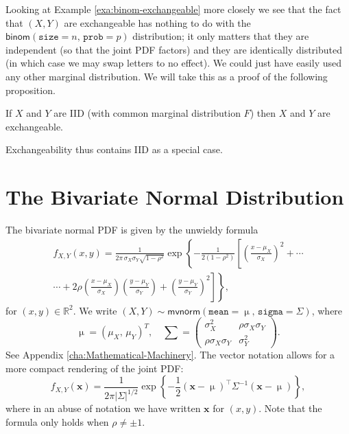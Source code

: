 \documentclass[captions=tableheading]{scrbook}
\begin{document}
Looking at Example \ref{exa:binom-exchangeable} more closely we see that the fact that \((X,Y)\) are exchangeable has nothing to do with the \(\mathsf{binom}(\mathtt{size}=n,\,\mathtt{prob}=p)\) distribution; it only matters that they are independent (so that the joint PDF factors) and they are identically distributed (in which case we may swap letters to no effect). We could just have easily used any other marginal distribution. We will take this as a proof of the following proposition.

\begin{prop}
If \(X\) and \(Y\) are IID (with common marginal distribution \(F\)) then \(X\) and \(Y\) are exchangeable. 
\end{prop}

Exchangeability thus contains IID as a special case. 
\section{The Bivariate Normal Distribution}
\label{sec-7-6}

\label{sec:The-Bivariate-Normal}

The bivariate normal PDF is given by the unwieldy formula
\begin{multline}
f_{X,Y}(x,y)=\frac{1}{2\pi\,\sigma_{X}\sigma_{Y}\sqrt{1-\rho^{2}}}\exp\left\{ -\frac{1}{2(1-\rho^{2})}\left[\left(\frac{x-\mu_{X}}{\sigma_{X}}\right)^{2}+\cdots\right.\right.\\
\left.\left.\cdots+2\rho\left(\frac{x-\mu_{X}}{\sigma_{X}}\right)\left(\frac{y-\mu_{Y}}{\sigma_{Y}}\right)+\left(\frac{y-\mu_{Y}}{\sigma_{Y}}\right)^{2}\right]\right\} ,
\end{multline}
for \((x,y)\in\mathbb{R}^{2}\). We write \((X,Y)\sim\mathsf{mvnorm}(\mathtt{mean}=\upmu,\,\mathtt{sigma}=\Sigma)\), where
\begin{equation}
\upmu=(\mu_{X},\,\mu_{Y})^{T},\quad\sum=\left(
\begin{array}{cc}
\sigma_{X}^{2} & \rho\sigma_{X}\sigma_{Y}\\
\rho\sigma_{X}\sigma_{Y} & \sigma_{Y}^{2}
\end{array}
\right).
\end{equation}
See Appendix \ref{cha:Mathematical-Machinery}. The vector notation allows for a more compact rendering of the joint PDF:
\begin{equation}
f_{X,Y}(\mathbf{x})=\frac{1}{2\pi\left|\Sigma\right|^{1/2}}\exp\left\{ -\frac{1}{2}\left(\mathbf{x}-\upmu\right)^{\top}\Sigma^{-1}\left(\mathbf{x}-\upmu\right)\right\} ,
\end{equation}
where in an abuse of notation we have written \(\mathbf{x}\) for \((x,y)\). Note that the formula only holds when \(\rho\neq\pm1\).
\end{document}
